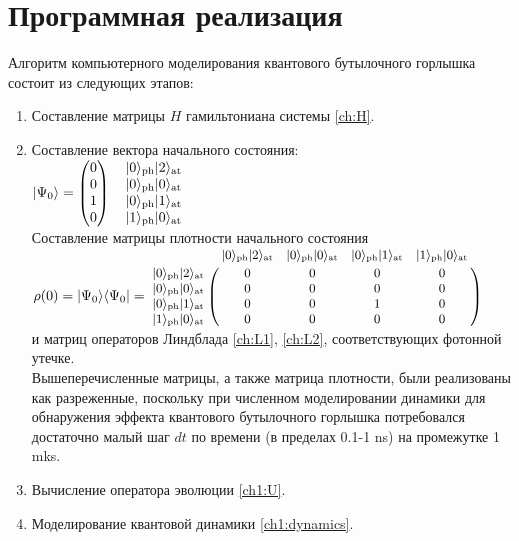 \section{Программная реализация}

Алгоритм компьютерного моделирования квантового бутылочного горлышка состоит из следующих этапов:
\begin{enumerate}
\item{
	Составление матрицы $H$ гамильтониана системы \eqref{ch:H}.\\
}
\item{
Составление вектора начального состояния:\\
$
	|\Psi_{0}\rangle = 
	\begin{pmatrix}
		0 \\ 
		0 \\
		1 \\
		0 
	\end{pmatrix}
	\begin{matrix}
    	\quad|0\rangle_{\text{\text{ph}}}|2\rangle_{\text{\text{at}}} \cr
		\quad|0\rangle_{\text{\text{ph}}}|0\rangle_{\text{\text{at}}} \cr
    	\quad|0\rangle_{\text{\text{ph}}}|1\rangle_{\text{\text{at}}} \cr
    	\quad|1\rangle_{\text{\text{ph}}}|0\rangle_{\text{\text{at}}}
	\end{matrix}
$
\\[24pt]
Составление матрицы плотности начального состояния\\[24pt]
$
	\rho(0) = |\Psi_{0}\ra\la\Psi_{0}| =
	{\small	
	\bordermatrix
	{
		&                |0\ra_{\text{\text{ph}}}|2\ra_{\text{\text{at}}} & |0\ra_{\text{\text{ph}}}|0\ra_{\text{\text{at}}} & |0\ra_{\text{\text{ph}}}|1\ra_{\text{\text{at}}} & |1\ra_{\text{\text{ph}}}|0\ra_{\text{\text{at}}} \cr
		|0\ra_{\text{\text{ph}}}|2\ra_{\text{\text{at}}} &      0 &      0 &      0 & 0 \cr
		|0\ra_{\text{\text{ph}}}|0\ra_{\text{\text{at}}} &      0 &      0 &      0 & 0\cr
		|0\ra_{\text{\text{ph}}}|1\ra_{\text{\text{at}}} &      0 &      0 &      1 & 0\cr
		|1\ra_{\text{\text{ph}}}|0\ra_{\text{\text{at}}} &      0 &      0 &      0 & 0\cr
	}
	}
$\\[12pt]
и матриц операторов Линдблада \eqref{ch:L1}, \eqref{ch:L2}, соответствующих фотонной утечке.\\

Вышеперечисленные матрицы, а также матрица плотности, были реализованы как разреженные, поскольку при численном моделировании динамики для обнаружения эффекта квантового бутылочного горлышка потребовался достаточно малый шаг $dt$ по времени (в пределах 0.1-1 ns) на промежутке 1 mks.\\
}
\item{Вычисление оператора эволюции \eqref{ch1:U}}.\\
\item{Моделирование квантовой динамики \eqref{ch1:dynamics}.\\

}
\end{enumerate}
